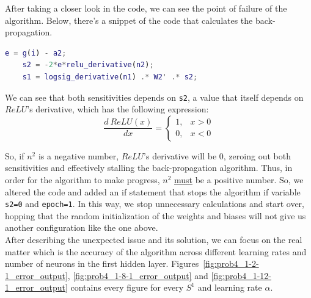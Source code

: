 After taking a closer look in the code, we can see the point of failure of the algorithm. Below, there's a snippet of the code that calculates the back-propagation.

\begin{lstlisting}[language=matlab]
	e = g(i) - a2;
	s2 = -2*e*relu_derivative(n2);
	s1 = logsig_derivative(n1) .* W2' .* s2;
\end{lstlisting}

We can see that both sensitivities depends on \verb*|s2|, a value that itself depends on $ReLU$'s derivative, which has the following expression:
\[
\dfrac{d\ ReLU\left(x\right)}{dx} = \left\{ 
\begin{array}{cc}
	1, & x >0\\
	0, & x<0
\end{array}
\right.
\]

So, if $n^2$ is a negative number, $ReLU$'s derivative will be $0$, zeroing out both sensitivities and effectively stalling the back-propagation algorithm. Thus, in order for the algorithm to make progress, $n^2$ \underline{must} be a positive number.
So, we altered the code and added an if statement that stops the algorithm if variable \verb*|s2=0| and \verb*|epoch=1|. In this way, we stop unnecessary calculations and start over, hopping that the random initialization of the weights and biases will not give us another configuration like the one above. \\

After describing the unexpected issue and its solution, we can focus on the real matter which is the accuracy of the algorithm across different learning rates and number of neurons in the first hidden layer. Figures~\ref{fig:prob4_1-2-1_error_output}, \ref{fig:prob4_1-8-1_error_output} and \ref{fig:prob4_1-12-1_error_output} contains every figure for every $S^1$ and learning rate $\alpha$.

